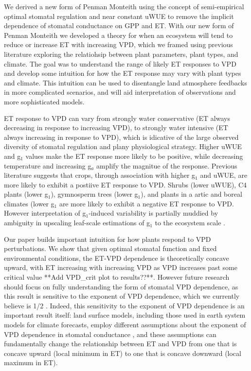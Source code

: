 We derived a new form of Penman Monteith using the concept of
semi-empirical optimal stomatal regulation \citep{Lin_2015,
MEDLYN_2011} and near constant uWUE \citep{Zhou_2015} to remove the
implicit dependence of stomatal conductance on GPP and ET. With our
new form of Penman Monteith we developed a theory for when an
ecosystem will tend to reduce or increase ET with increasing VPD,
which we framed using previous literature exploring the relatiohsip
between plant parameters, plant types, and climate. The goal was to
understand the range of likely ET responses to VPD and develop some
intuition for how the ET response may vary with plant types and
climate. This intuition can be used to disentangle land atmosphere
feedbacks in more complicated scenarios, and will aid interpretation
of observations and more sophisticated models.

ET response to VPD can vary from strongly water conservative (ET
always decreasing in response to increasing VPD), to strongly water
intensive (ET always increasing in response to VPD), which is
idicative of the large observed diversity of stomatal regulation and
plany physiological strategy. Higher uWUE and g$_1$ values make the ET
response more likely to be positive, while decreasing temperature and
increasing g$_a$ amplify the magnitue of the response. Previous
literature \citep{Zhou_2015, Lin_2015} suggests that crops, through
association with higher g$_1$ and uWUE, are more likely to exhibit a
postiive ET response to VPD. Shrubs (lower uWUE), C4 plants (lower
g$_1$), gymnosperm trees (lower g$_1$), and plants in a artic and
boreal climates (lower g$_1$ are more likely to exhibit a negative ET
response to VPD. However interpretation of g$_1$-induced variability
is partially muddied by ambiguity in upscaling leaf-scale estimations
of g$_1$ to the ecosystem scale \citep{Medlyn_2017}.

Our paper builds important intuition for how plants respond to VPD
perturbations. We show that given optimal stomatal function and fixed
environmental conditions, the ET-VPD dependence is theoretically
concave upward, with ET increasing with increasing VPD as VPD
increases past some critical value **Add VPD_crit plot to
results??**. However future research should focus on fully
understanding the form of stomatal VPD dependence, as this result is
sensitive to the exponent of VPD dependence, which we currently
believe is 1/2 \citep{MEDLYN_2011, Zhou_2014}. Indeed, this
sensitivity to the exponent of VPD dependence is an important result
itself: land surface models, including those used in earth system
models for climate forecasts, employ different assumptions about the
exponent of VPD dependence in stomatal conductance
\citep[e.g.,][]{Ball_1987, Leuning_1990, MEDLYN_2011}, and these
assumptions can fundamentally change the relationship between ET and
VPD from one that is concave upward (local minimum in ET) to one that
is concave downward (local maximum in ET).

